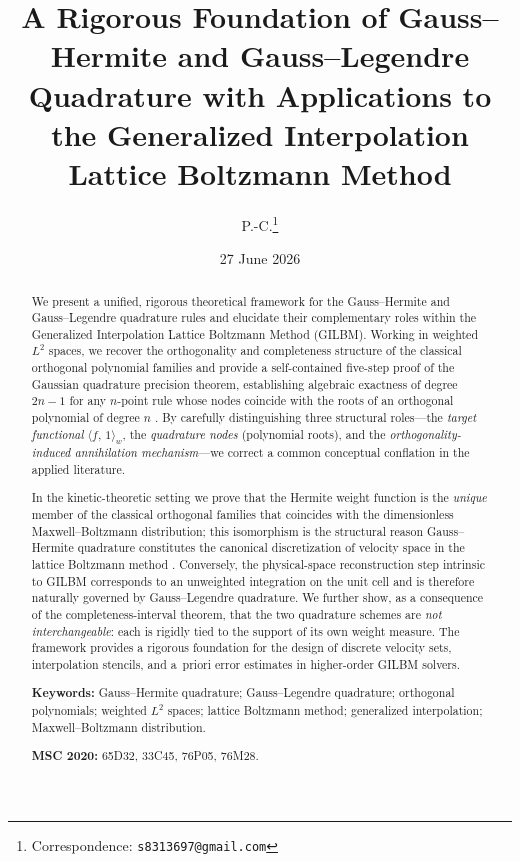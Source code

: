 \documentclass[11pt,a4paper]{article}
\title{\Large\bfseries
A Rigorous Foundation of Gauss--Hermite and Gauss--Legendre Quadrature
with Applications to the Generalized Interpolation Lattice Boltzmann Method}
\author{P.-C.\thanks{Correspondence: \texttt{s8313697@gmail.com}}}
\date{27 June 2026}
\theoremstyle{definition}
\newcommand{\ipw}[2]{\langle #1,\, #2 \rangle_{w}}
\begin{document}
\maketitle

\begin{abstract}
\noindent
We present a unified, rigorous theoretical framework for the Gauss--Hermite and
Gauss--Legendre quadrature rules and elucidate their complementary roles within
the Generalized Interpolation Lattice Boltzmann Method (GILBM). Working in
weighted $L^2$ spaces, we recover the orthogonality and completeness structure
of the classical orthogonal polynomial families
\cite{Szego1975} and provide a self-contained five-step proof of the Gaussian
quadrature precision theorem, establishing algebraic exactness of degree
$2n-1$ for any $n$-point rule whose nodes coincide with the roots of an
orthogonal polynomial of degree $n$
\cite{Stroud1971,DavisRabinowitz1984}. By carefully distinguishing three
structural roles---the \emph{target functional} $\ipw{f}{1}$, the
\emph{quadrature nodes} (polynomial roots), and the
\emph{orthogonality-induced annihilation mechanism}---we correct a common
conceptual conflation in the applied literature.

In the kinetic-theoretic setting we prove that the Hermite weight function is
the \emph{unique} member of the classical orthogonal families that coincides
with the dimensionless Maxwell--Boltzmann distribution; this isomorphism is the
structural reason Gauss--Hermite quadrature constitutes the canonical
discretization of velocity space in the lattice Boltzmann method
\cite{HeLuo1997a,HeLuo1997b,ShanHe1998,ShanYuanChen2006}. Conversely, the
physical-space reconstruction step intrinsic to GILBM corresponds to an
unweighted integration on the unit cell and is therefore naturally governed by
Gauss--Legendre quadrature. We further show, as a consequence of the
completeness-interval theorem, that the two quadrature schemes are
\emph{not interchangeable}: each is rigidly tied to the support of its own
weight measure. The framework provides a rigorous foundation for the design of
discrete velocity sets, interpolation stencils, and a~priori error estimates in
higher-order GILBM solvers.

\medskip
\noindent\textbf{Keywords:} Gauss--Hermite quadrature; Gauss--Legendre
quadrature; orthogonal polynomials; weighted $L^2$ spaces; lattice Boltzmann
method; generalized interpolation; Maxwell--Boltzmann distribution.

\medskip
\noindent\textbf{MSC 2020:} 65D32, 33C45, 76P05, 76M28.
\end{abstract}
\end{document}
